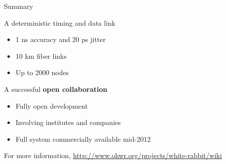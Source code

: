 \documentclass[compress,red]{beamer}
\begin{document}
\begin{frame}{Summary}

\begin{block}{A deterministic timing and data link}
\begin{itemize}
\item 1 ns accuracy and 20 ps jitter
\item 10 km fiber links
\item Up to 2000 nodes
\end{itemize}
\end{block}

\begin{block}{A successful \textbf{open collaboration}}
\begin{itemize}
\item Fully open development
\item Involving institutes and companies
\item Full system commercially available mid-2012
\end{itemize}
\end{block}

\begin{center}
  For more information, \href{http://www.ohwr.org/projects/white-rabbit/wiki}{http://www.ohwr.org/projects/white-rabbit/wiki}    
\end{center}
\end{frame}
\end{document}
